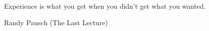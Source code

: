 \documentclass[12pt,a4paper,twoside]{book}
\begin{document}


\newpage \null \thispagestyle{empty} \newpage

\pagestyle{empty}


\pagestyle{headings}
\frontmatter

\newpage
\thispagestyle{empty}
\vspace*{0.8\textheight}
\setlength{\epigraphwidth}{9cm}
\renewcommand{\textflush}{flushright}
\epigraph{Experience is what you get when you didn’t get what you wanted.}
            {Randy Pausch (The Last Lecture)}

\newpage\null\thispagestyle{empty}\newpage
\newpage
\newpage
\newpage
\tableofcontents
\listoffigures
{}
\listoftables
{}
\newpage\null\thispagestyle{empty}\newpage

\mainmatter
% 

\backmatter


\end{document}
